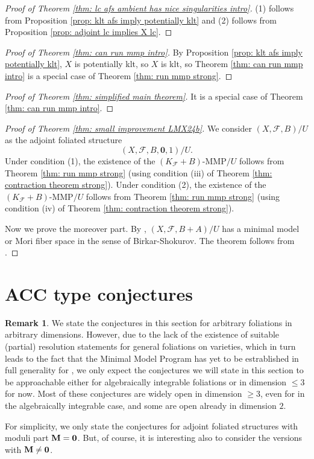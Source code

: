 \documentclass[12pt]{amsart}
\numberwithin{equation}{section}
\newcommand{\Mm}{{\bf{M}}}
\newcommand{\Ff}{\mathcal{F}}
\theoremstyle{definition}
\theoremstyle{definition}
\newtheorem{rem}[thm]{Remark}
\theoremstyle{definition}
\begin{document}
\begin{proof}[Proof of Theorem \ref{thm: lc afs ambient has nice singularities intro}]
(1) follows from  Proposition \ref{prop: klt afs imply potentially klt} and (2) follows from Proposition \ref{prop: adjoint lc implies X lc}.
\end{proof}


\begin{proof}[Proof of Theorem \ref{thm: can run mmp intro}]
    By Proposition \ref{prop: klt afs imply potentially klt}, $X$ is potentially klt, so $X$ is klt, so Theorem \ref{thm: can run mmp intro} is a special case of Theorem \ref{thm: run mmp strong}.
\end{proof}

\begin{proof}[Proof of Theorem \ref{thm: simplified main theorem}]
    It is a special case of Theorem \ref{thm: can run mmp intro}.
\end{proof}

\begin{proof}[Proof of Theorem \ref{thm: small improvement LMX24b}]
    We consider $(X,\Ff,B)/U$ as the adjoint foliated structure $$(X,\Ff,B,\bm{0},1)/U.$$ Under condition (1), the existence of the $(K_{\Ff}+B)$-MMP$/U$ follows from Theorem \ref{thm: run mmp strong} (using condition (iii) of Theorem \ref{thm: contraction theorem strong}). Under condition (2), the existence of the $(K_{\Ff}+B)$-MMP$/U$ follows from Theorem \ref{thm: run mmp strong} (using condition (iv) of Theorem \ref{thm: contraction theorem strong}).

    Now we prove the moreover part. By \cite[Theorem 1.10]{LMX24b}, $(X,\Ff,B+A)/U$ has a minimal model or Mori fiber space in the sense of Birkar-Shokurov. The theorem follows from \cite[Theorem 1.11(1)]{LMX24b}.
\end{proof}




\appendix





\section{ACC type conjectures}\label{sec: acc}


\begin{rem}
We state the conjectures in this section for arbitrary foliations in arbitrary dimensions. 
However, due to the lack of the existence of suitable (partial) resolution statements for general foliations on varieties,
which in turn leads to the fact that the Minimal Model Program has yet to be estrablished in full generality for , 
we only expect the conjectures we will state in this section to be approachable either for algebraically integrable foliations or in dimension $\leq 3$ for now. 
Most of these conjectures are widely open in dimension $\geq 3$, even for in the algebraically integrable case, and some are open already in dimension $2$.

For simplicity, we only state the conjectures for adjoint foliated structures with moduli part $\Mm=\bm{0}$. But, of course, it is interesting also to consider the  versions with $\Mm\not=\bm{0}$.
\end{rem}
\end{document}
